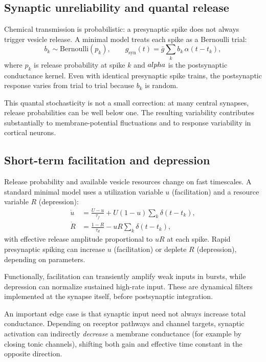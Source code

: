 \subsection{Synaptic unreliability and quantal release}

Chemical transmission is probabilistic: a presynaptic spike does not always trigger vesicle release. A minimal model treats each spike as a Bernoulli trial:
%
\begin{equation}
  b_k \sim \mathrm{Bernoulli}(p_k), \qquad
  g_{\text{syn}}(t)=\bar g\sum_k b_k\,\alpha(t-t_k),
  \label{eq:bernoulli-release}
\end{equation}
%
where $p_k$ is release probability at spike $k$ and $\\alpha$ is the postsynaptic conductance kernel. Even with identical presynaptic spike trains, the postsynaptic response varies from trial to trial because $b_k$ is random.

This quantal stochasticity is not a small correction: at many central synapses, release probabilities can be well below one. The resulting variability contributes substantially to membrane-potential fluctuations and to response variability in cortical neurons.

\subsection{Short-term facilitation and depression}

Release probability and available vesicle resources change on fast timescales. A standard minimal model uses a utilization variable $u$ (facilitation) and a resource variable $R$ (depression):
%
\begin{align}
  \dot u &= \frac{U-u}{\tau_f} + U(1-u)\sum_k \delta(t-t_k), \label{eq:stp-u} \\
  \dot R &= \frac{1-R}{\tau_d} - uR\sum_k \delta(t-t_k), \label{eq:stp-r}
\end{align}
%
with effective release amplitude proportional to $uR$ at each spike. Rapid presynaptic spiking can increase $u$ (facilitation) or deplete $R$ (depression), depending on parameters.

Functionally, facilitation can transiently amplify weak inputs in bursts, while depression can normalize sustained high-rate input. These are dynamical filters implemented at the synapse itself, before postsynaptic integration.

An important edge case is that synaptic input need not always increase total conductance. Depending on receptor pathways and channel targets, synaptic activation can indirectly \emph{decrease} a membrane conductance (for example by closing tonic channels), shifting both gain and effective time constant in the opposite direction.


